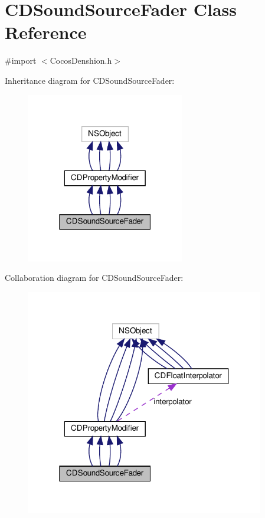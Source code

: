 \hypertarget{interfaceCDSoundSourceFader}{}\section{C\+D\+Sound\+Source\+Fader Class Reference}
\label{interfaceCDSoundSourceFader}


{\ttfamily \#import $<$Cocos\+Denshion.\+h$>$}



Inheritance diagram for C\+D\+Sound\+Source\+Fader\+:
\nopagebreak
\begin{figure}[H]
\begin{center}
\leavevmode
\includegraphics[width=195pt]{interfaceCDSoundSourceFader__inherit__graph}
\end{center}
\end{figure}


Collaboration diagram for C\+D\+Sound\+Source\+Fader\+:
\nopagebreak
\begin{figure}[H]
\begin{center}
\leavevmode
\includegraphics[width=295pt]{interfaceCDSoundSourceFader__coll__graph}
\end{center}
\end{figure}
